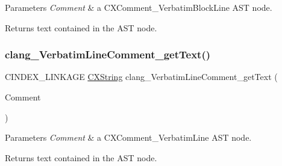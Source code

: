 \begin{DoxyParams}{Parameters}
{\em Comment} & a {\ttfamily C\+X\+Comment\+\_\+\+Verbatim\+Block\+Line} A\+ST node.\\
\hline
\end{DoxyParams}
\begin{DoxyReturn}{Returns}
text contained in the A\+ST node. 
\end{DoxyReturn}
\mbox{\label{group__CINDEX__COMMENT_ga4eb1de9012b525f14051409427bd8eb2}} 
\subsubsection{\texorpdfstring{clang\+\_\+\+Verbatim\+Line\+Comment\+\_\+get\+Text()}{clang\_VerbatimLineComment\_getText()}}
{\footnotesize\ttfamily C\+I\+N\+D\+E\+X\+\_\+\+L\+I\+N\+K\+A\+GE \hyperlink{structCXString}{C\+X\+String} clang\+\_\+\+Verbatim\+Line\+Comment\+\_\+get\+Text (\begin{DoxyParamCaption}\item[{\hyperlink{structCXComment}{C\+X\+Comment}}]{Comment }\end{DoxyParamCaption})}


\begin{DoxyParams}{Parameters}
{\em Comment} & a {\ttfamily C\+X\+Comment\+\_\+\+Verbatim\+Line} A\+ST node.\\
\hline
\end{DoxyParams}
\begin{DoxyReturn}{Returns}
text contained in the A\+ST node. 
\end{DoxyReturn}
